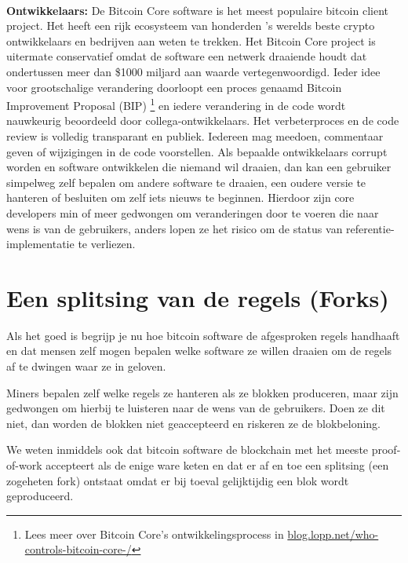 \documentclass[smalldemyvopaper,11pt,twoside,onecolumn,openright,extrafontsizes]{memoir}
\begin{document}
\paragraph{}
\noindent\textbf{Ontwikkelaars:}
De Bitcoin Core software is het meest populaire bitcoin client project. Het heeft een rijk ecosysteem van honderden 's werelds beste crypto ontwikkelaars en bedrijven aan weten te trekken. Het Bitcoin Core project is uitermate conservatief omdat de software een netwerk draaiende houdt dat ondertussen meer dan \$1000 miljard aan waarde vertegenwoordigd. Ieder idee voor grootschalige verandering doorloopt een proces genaamd Bitcoin Improvement Proposal (BIP) \footnote{Lees meer over Bitcoin Core's ontwikkelingsprocess in \href{https://blog.lopp.net/who-controls-bitcoin-core-/}{blog.lopp.net/who-controls-bitcoin-core-/}} en iedere verandering in de code wordt nauwkeurig beoordeeld door collega-ontwikkelaars. Het verbeterproces en de code review is volledig transparant en publiek. Iedereen mag meedoen, commentaar geven of wijzigingen in de code voorstellen. Als bepaalde ontwikkelaars corrupt worden en software ontwikkelen die niemand wil draaien, dan kan een gebruiker simpelweg zelf bepalen om andere software te draaien, een oudere versie te hanteren of besluiten om zelf iets nieuws te beginnen. Hierdoor zijn core developers min of meer gedwongen om veranderingen door te voeren die naar wens is van de gebruikers, anders lopen ze het risico om de status van referentie-implementatie te verliezen. 

\section{Een splitsing van de regels (Forks)}

Als het goed is begrijp je nu hoe bitcoin software de afgesproken regels handhaaft en dat mensen zelf mogen bepalen welke software ze willen draaien om de regels af te dwingen waar ze in geloven.

Miners bepalen zelf welke regels ze hanteren als ze blokken produceren, maar zijn gedwongen om hierbij te luisteren naar de wens van de gebruikers. Doen ze dit niet, dan worden de blokken niet geaccepteerd en riskeren ze de blokbeloning.

We weten inmiddels ook dat bitcoin software de blockchain met het meeste proof-of-work accepteert als de enige ware keten en dat er af en toe een splitsing (een zogeheten fork) ontstaat omdat er bij toeval gelijktijdig een blok wordt geproduceerd.
\end{document}

